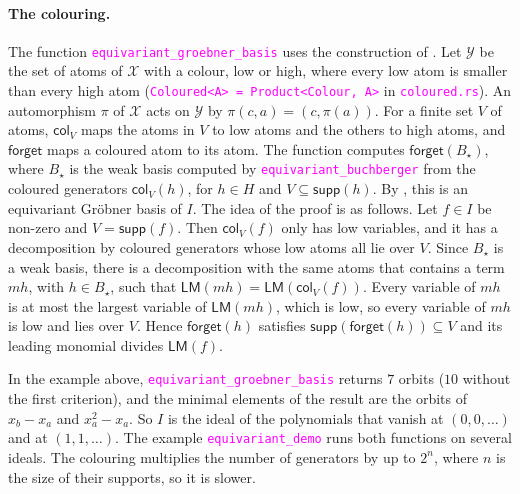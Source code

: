 \documentclass[12pt,a4paper,article]{memoir}
\newcommand{\struct}{\mathcal{X}}
\newcommand{\code}[1]{\texttt{\textcolor{magenta}{#1}}}
\theoremstyle{definition}
\begin{document}
\paragraph{The colouring.}
The function \code{equivariant\_groebner\_basis} uses the construction of \cite[Section 5]{GL25}.
Let $\mathcal{Y}$ be the set of atoms of $\struct$ with a colour, low or high,
where every low atom is smaller than every high atom (\code{Coloured<A> = Product<Colour, A>} in \code{coloured.rs}).
An automorphism $\pi$ of $\struct$ acts on $\mathcal{Y}$ by $\pi(c, a) = (c, \pi(a))$.
For a finite set $V$ of atoms, $\mathsf{col}_V$ maps the atoms in $V$ to low atoms and the others to high atoms,
and $\mathsf{forget}$ maps a coloured atom to its atom.
The function computes $\mathsf{forget}(B_\star)$,
where $B_\star$ is the weak basis computed by \code{equivariant\_buchberger}
from the coloured generators $\mathsf{col}_V(h)$, for $h \in H$ and $V \subseteq \mathsf{supp}(h)$.
By \cite[Lemma 28]{GL25}, this is an equivariant Gr\"{o}bner basis of $I$.
The idea of the proof is as follows.
Let $f \in I$ be non-zero and $V = \mathsf{supp}(f)$.
Then $\mathsf{col}_V(f)$ only has low variables,
and it has a decomposition by coloured generators whose low atoms all lie over $V$.
Since $B_\star$ is a weak basis, there is a decomposition with the same atoms
that contains a term $m h$, with $h \in B_\star$, such that $\mathsf{LM}(m h) = \mathsf{LM}(\mathsf{col}_V(f))$.
Every variable of $m h$ is at most the largest variable of $\mathsf{LM}(m h)$, which is low,
so every variable of $m h$ is low and lies over $V$.
Hence $\mathsf{forget}(h)$ satisfies $\mathsf{supp}(\mathsf{forget}(h)) \subseteq V$
and its leading monomial divides $\mathsf{LM}(f)$.

In the example above, \code{equivariant\_groebner\_basis} returns $7$ orbits ($10$ without the first criterion),
and the minimal elements of the result are the orbits of $x_b - x_a$ and $x_a^2 - x_a$.
So $I$ is the ideal of the polynomials that vanish at $(0, 0, \dots)$ and at $(1, 1, \dots)$.
The example \code{equivariant\_demo} runs both functions on several ideals.
The colouring multiplies the number of generators by up to $2^n$,
where $n$ is the size of their supports, so it is slower.
%
\end{document}
